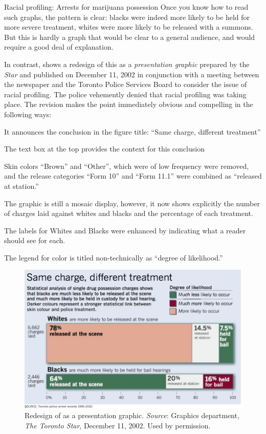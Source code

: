 \documentclass[11pt]{book}
\begin{document}
\begin{Example}[arrests0]{Racial profiling: Arrests for marijuana possession}
Once you know how to read such graphs, the pattern is clear: blacks were indeed more likely
to be held for more severe treatment, whites were more likely to be released with a
summons.  But this is hardly a graph that would be clear to a general audience,
and would require a good deal of explanation.

In contrast,  shows a redesign of this as a \emph{presentation graphic}
prepared by the \emph{Star} and published on December 11, 2002
in conjunction with a meeting between the newspaper and the Toronto Police Services Board
to consider the issue of racial profiling.  The police vehemently denied that racial profiling
was taking place.  The revision makes the point immediately obvious and compelling in the
following ways:
\begin{itemize*}
 \item It announces the conclusion in the figure title: ``Same charge, different treatment''
 \item The text box at the top provides the context for this conclusion
 \item Skin colors ``Brown'' and ``Other'', which were of low frequency were removed, 
 and the release categories ``Form 10'' and ``Form 11.1'' were combined as ``released at station.''
 \item The graphic is still a mosaic display, however, it now shows explicitly the number
 of charges laid against whites and blacks and the percentage of each treatment.
 \item The labels for Whites and Blacks were enhanced by indicating what a reader should see for each.
 \item The legend for color is titled non-technically as ``degree of likelihood.''
\end{itemize*}

\begin{figure}[htb]
\centering
\includegraphics[width=.9\textwidth]{ch01/fig/TorStar/TorontoStar-graphic-2002-12-11-2}
\caption{Redesign of  as a presentation graphic. \emph{Source}: Graphics department, \emph{The Toronto Star}, December 11, 2002. Used by permission.}\label{fig:arrests0-star}
\end{figure}


\end{Example}
\end{document}
